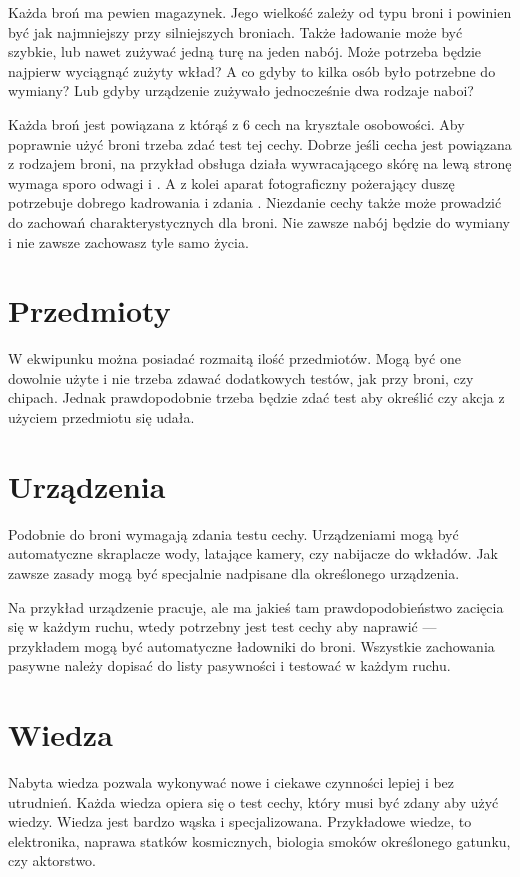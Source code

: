 Każda broń ma pewien magazynek.
Jego wielkość zależy od typu broni i powinien być jak najmniejszy przy silniejszych broniach.
Także ładowanie może być szybkie, lub nawet zużywać jedną turę na jeden nabój.
Może potrzeba będzie najpierw wyciągnąć zużyty wkład?
A co gdyby to kilka osób było potrzebne do wymiany?
Lub gdyby urządzenie zużywało jednocześnie dwa rodzaje naboi?

Każda broń jest powiązana z którąś z 6 cech na krysztale osobowości.
Aby poprawnie użyć broni trzeba zdać test tej cechy.
Dobrze jeśli cecha jest powiązana z rodzajem broni, na przykład obsługa działa wywracającego skórę na lewą stronę wymaga sporo odwagi i \abh.
A z kolei aparat fotograficzny pożerający duszę potrzebuje dobrego kadrowania i zdania \abp.
Niezdanie cechy także może prowadzić do zachowań charakterystycznych dla broni.
Nie zawsze nabój będzie do wymiany i nie zawsze zachowasz tyle samo życia.

\section{Przedmioty}
W ekwipunku można posiadać rozmaitą ilość przedmiotów.
Mogą być one dowolnie użyte i nie trzeba zdawać dodatkowych testów, jak przy broni, czy chipach.
Jednak prawdopodobnie trzeba będzie zdać test aby określić czy akcja z użyciem przedmiotu się udała.

\section{Urządzenia}
Podobnie do broni wymagają zdania testu cechy.
Urządzeniami mogą być automatyczne skraplacze wody, latające kamery, czy nabijacze do wkładów.
Jak zawsze zasady mogą być specjalnie nadpisane dla określonego urządzenia.

Na przykład urządzenie pracuje, ale ma jakieś tam prawdopodobieństwo zacięcia się w każdym ruchu, wtedy potrzebny jest test cechy aby naprawić --- przykładem mogą być automatyczne ładowniki do broni.
Wszystkie zachowania pasywne należy dopisać do listy pasywności i testować w każdym ruchu.

\section{Wiedza}
Nabyta wiedza pozwala wykonywać nowe i ciekawe czynności lepiej i bez utrudnień.
Każda wiedza opiera się o test cechy, który musi być zdany aby użyć wiedzy.
Wiedza jest bardzo wąska i specjalizowana.
Przykładowe wiedze, to elektronika, naprawa statków kosmicznych, biologia smoków określonego gatunku, czy aktorstwo.


